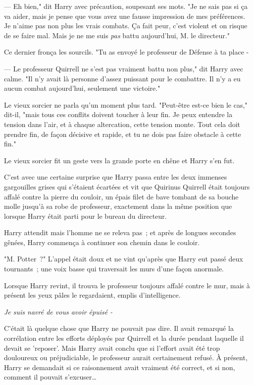 --- Eh bien," dit Harry avec précaution, soupesant ses mots. "Je ne sais pas si ça va aider, mais je pense que vous avez une fausse impression de mes préférences. Je n'aime pas non plus les vrais combats. Ça fait peur, c'est violent et on risque de se faire mal. Mais je ne me suis \emph{pas} battu aujourd'hui, M. le directeur."

Ce dernier fronça les sourcils. "Tu as envoyé le professeur de Défense à ta place -

--- Le professeur Quirrell ne s'est pas vraiment battu non plus," dit Harry avec calme. "Il n'y avait là personne d'assez puissant pour le combattre. Il n'y a eu aucun combat aujourd'hui, seulement une victoire."

Le vieux sorcier ne parla qu'un moment plus tard. "Peut-être est-ce bien le cas," dit-il, "mais tous ces conflits doivent toucher à leur fin. Je peux entendre la tension dans l'air, et à chaque altercation, cette tension monte. Tout cela doit prendre fin, de façon décisive et rapide, et tu ne dois pas faire obstacle à cette fin."

Le vieux sorcier fit un geste vers la grande porte en chêne et Harry s'en fut.

\later

C'est avec une certaine surprise que Harry passa entre les deux immenses gargouilles grises qui s'étaient écartées et vit que Quirinus Quirrell était toujours affalé contre la pierre du couloir, un épais filet de bave tombant de sa bouche molle jusqu'à sa robe de professeur, exactement dans la même position que lorsque Harry était parti pour le bureau du directeur.

Harry attendit mais l'homme ne se releva pas~; et après de longues secondes gênées, Harry commença à continuer son chemin dans le couloir.

"M. Potter~?" L'appel était doux et ne vint qu'après que Harry eut passé deux tournants~; une voix basse qui traversait les murs d'une façon anormale.

Lorsque Harry revint, il trouva le professeur toujours affalé contre le mur, mais à présent les yeux pâles le regardaient, emplis d'intelligence.

\emph{Je suis navré de vous avoir épuisé -}

C'était là quelque chose que Harry ne pouvait pas dire. Il avait remarqué la corrélation entre les efforts déployés par Quirrell et la durée pendant laquelle il devait se 'reposer'. Mais Harry avait conclu que si l'effort avait été trop douloureux ou préjudiciable, le professeur aurait certainement refusé. À présent, Harry se demandait si ce raisonnement avait vraiment été correct, et si non, comment il pouvait s'excuser…


